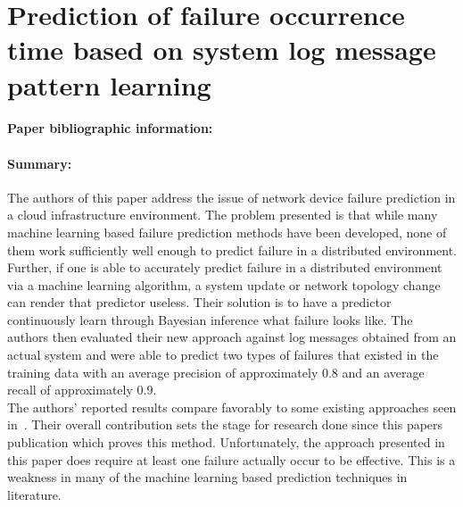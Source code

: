 \documentclass[11pt]{article}
\begin{document}
\newpage
\section{Prediction of failure occurrence time based on system log message
pattern learning}
\paragraph{Paper bibliographic information:}
\paragraph{Summary:}  The authors of this paper address the issue of network
device failure prediction in a cloud infrastructure environment.  The problem
presented is that while many machine learning based failure prediction methods
have been developed, none of them work sufficiently well enough to predict
failure in a distributed environment.  Further, if one is able to accurately
predict failure in a distributed environment via a machine learning algorithm,
a system update or network topology change can render that predictor useless.
Their solution is to have a predictor continuously learn through Bayesian
inference what failure looks like.  The authors then evaluated their new
approach against log messages obtained from an actual system and were able to
predict two types of failures that existed in the training data with an average
precision of approximately 0.8 and an average recall of approximately 0.9.\\

The authors' reported results compare favorably to some existing approaches
seen in~\cite{salfnerSurvey}.  Their overall contribution sets the stage for
research done since this papers publication which proves this method.
Unfortunately, the approach presented in this paper does require at least one
failure actually occur to be effective.  This is a weakness in many of the
machine learning based prediction techniques in literature.
\end{document}
